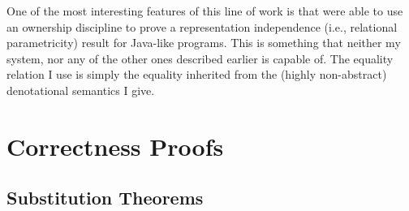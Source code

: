 One of the most interesting features of this line of work is that
\citet{banerjee-naumann-rep} were able to use an ownership discipline to
prove a representation independence (i.e., relational parametricity)
result for Java-like programs.  This is something that neither my
system, nor any of the other ones described earlier is capable of.
The equality relation I use is simply the equality inherited from the
(highly non-abstract) denotational semantics I give.


\section{Correctness Proofs}

\subsection{Substitution Theorems}

